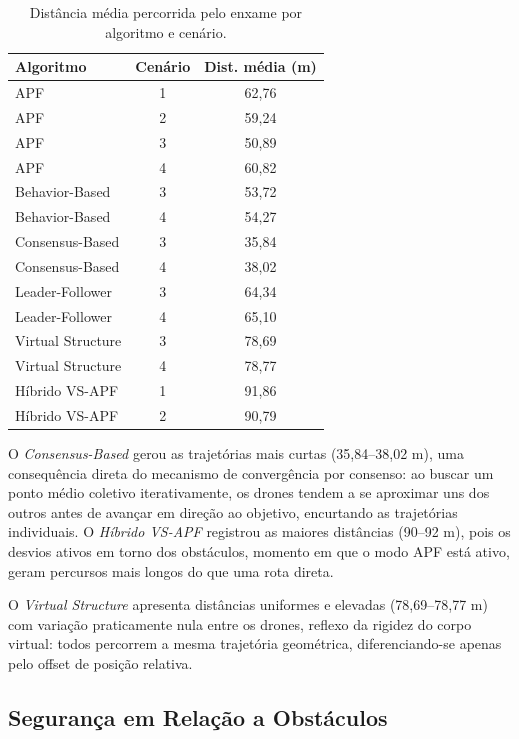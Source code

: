 \begin{table}[ht]
\centering
\caption{Distância média percorrida pelo enxame por algoritmo e cenário.}
\label{tab:distancia}
\begin{tabular}{|p{3.2cm}|c|c|}
\hline
\textbf{Algoritmo} & \textbf{Cenário} & \textbf{Dist. média (m)} \\ \hline
APF             & 1 & 62,76 \\ \hline
APF             & 2 & 59,24 \\ \hline
APF             & 3 & 50,89 \\ \hline
APF             & 4 & 60,82 \\ \hline
Behavior-Based  & 3 & 53,72 \\ \hline
Behavior-Based  & 4 & 54,27 \\ \hline
Consensus-Based & 3 & 35,84 \\ \hline
Consensus-Based & 4 & 38,02 \\ \hline
Leader-Follower & 3 & 64,34 \\ \hline
Leader-Follower & 4 & 65,10 \\ \hline
Virtual Structure & 3 & 78,69 \\ \hline
Virtual Structure & 4 & 78,77 \\ \hline
Híbrido VS-APF  & 1 & 91,86 \\ \hline
Híbrido VS-APF  & 2 & 90,79 \\ \hline
\end{tabular}
\end{table}

O \textit{Consensus-Based} gerou as trajetórias mais curtas (35,84--38,02 m), uma consequência direta do mecanismo de convergência por consenso: ao buscar um ponto médio coletivo iterativamente, os drones tendem a se aproximar uns dos outros antes de avançar em direção ao objetivo, encurtando as trajetórias individuais. O \textit{Híbrido VS-APF} registrou as maiores distâncias (90--92 m), pois os desvios ativos em torno dos obstáculos, momento em que o modo APF está ativo, geram percursos mais longos do que uma rota direta.

O \textit{Virtual Structure} apresenta distâncias uniformes e elevadas (78,69--78,77 m) com variação praticamente nula entre os drones, reflexo da rigidez do corpo virtual: todos percorrem a mesma trajetória geométrica, diferenciando-se apenas pelo offset de posição relativa.

\subsection{Segurança em Relação a Obstáculos}

